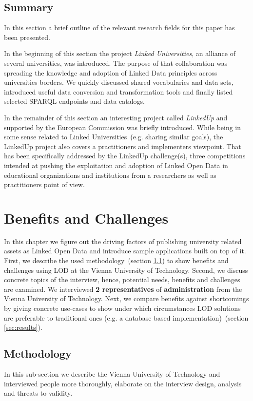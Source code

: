 \documentclass{article}
\begin{document}
\subsection{Summary}
In this section a brief outline of the relevant research fields for this paper has been presented.

In the beginning of this section the project \textit{Linked Universities}, an alliance of several universities, was introduced. The purpose of that collaboration was spreading the knowledge and adoption of Linked Data principles across universities borders. We quickly discussed shared vocabularies and data sets, introduced useful data conversion and transformation tools and finally listed selected SPARQL endpoints and data catalogs.

In the remainder of this section an interesting project called \textit{LinkedUp} and supported by the European Commission was briefly introduced. While being in some sense related to Linked Universities~(e.g. sharing similar goals), the LinkedUp project also covers a practitioners and implementers viewpoint. That has been specifically addressed by the LinkedUp challenge(s), three competitions intended at pushing the exploitation and adoption of Linked Open Data in educational organizations and institutions from a researchers as well as practitioners point of view. 
 
\section{Benefits and Challenges}
In this chapter we figure out the driving factors of publishing university related assets as Linked Open Data and introduce sample applications built on top of it. First, we describe the used methodology~(section \ref{sec:methodology}) to show benefits and challenges using LOD at the Vienna University of Technology. Second, we discuss concrete topics of the interview, hence, potential needs, benefits and challenges are examined. We interviewed \textbf{2 representatives} of \textbf{administration} from the Vienna University of Technology. Next, we compare benefits against shortcomings by giving concrete use-cases to show under which circumstances LOD solutions are preferable to traditional ones (e.g. a database based implementation)~(section \ref{sec:results}). 

\subsection{Methodology}
\label{sec:methodology}
In this sub-section we describe the Vienna University of Technology and interviewed people more thoroughly, elaborate on the interview design, analysis and threats to validity.
\end{document}
